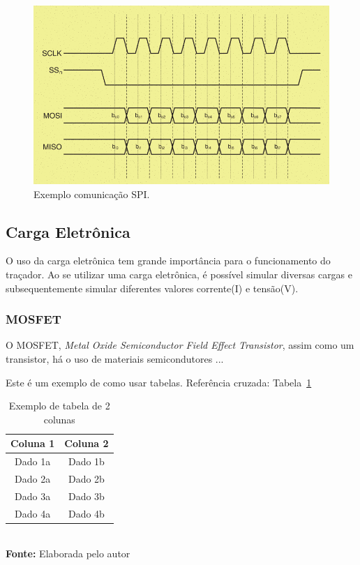 \FloatBarrier
\begin{figure}[!htbp]
	\centering
	\includegraphics[scale=0.7]{imagens/SPI}
	\caption{Exemplo comunicação SPI. %
	}
	\label{fig:SPI}
\end{figure}
\FloatBarrier



\subsection{Carga Eletrônica}

O uso da carga eletrônica tem grande importância para o funcionamento do traçador. Ao se utilizar uma carga eletrônica, é possível simular diversas cargas e subsequentemente simular diferentes valores corrente(I) e tensão(V).

\subsubsection{MOSFET}

O MOSFET, \textit{Metal Oxide Semiconductor Field Effect Transistor}, assim como um transistor, há o uso de materiais semicondutores ...

Este é um exemplo de como usar tabelas. Referência cruzada: Tabela~\ref{tab:exemplo}


\FloatBarrier
\begin{table}[!htbp]
\centering
\caption{Exemplo de tabela de 2 colunas}
	\begin{tabular}{ c | c }
		\hline
		\textbf{Coluna 1} & \textbf{Coluna 2} \\ \hline
		Dado 1a           & Dado 1b           \\ \hline
		Dado 2a           & Dado 2b           \\ \hline
		Dado 3a           & Dado 3b           \\ \hline
		Dado 4a           & Dado 4b           \\ \hline
	\end{tabular}
	\\ \vspace{0.2cm}
	\textbf{Fonte:} Elaborada pelo autor
	\label{tab:exemplo}
\end{table}
\FloatBarrier


